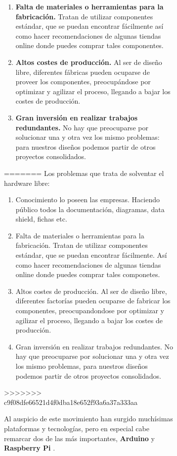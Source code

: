 \begin{itemize}
\begin{itemize}
\begin{figure}[h]
\begin{figure}[h]
\begin{enumerate}
	\item \textbf{Falta de materiales o herramientas para la fabricación.} 	Tratan de utilizar componentes estándar, que se puedan encontrar fácilmente así como hacer recomendaciones de algunas tiendas online donde puedes comprar tales componentes.  

	\item \textbf{Altos costes de producción.} Al ser de diseño libre, diferentes fábricas pueden ocuparse de proveer los componentes, preocupándose por optimizar y agilizar el proceso, llegando a bajar los costes de producción.

	\item \textbf{Gran inversión en realizar trabajos redundantes.}	No hay que preocuparse por solucionar una y otra vez los mismo problemas: para nuestros diseños podemos partir de otros proyectos consolidados.
\end{enumerate}

=======
Los problemas que trata de solventar el hardware libre:

\bigskip
\begin{enumerate}
	\item Conocimiento lo poseen las empresas.
	Haciendo público todos la documentación, diagramas, data shield, fichas etc.

	\item Falta de materiales o herramientas para la fabricación.
	Tratan de utilizar componentes estándar, que se puedan encontrar fácilmente. 
	Así como hacer recomendaciones de algunas tiendas online donde puedes comprar tales componetes.  

	\item Altos costes de producción.
	Al ser de diseño libre, diferentes factorías pueden ocuparse de fabricar los componentes, preocupandondose por optimizar y agilizar el proceso, llegando a bajar los costes de producción.

	\item Gran inversión en realizar trabajos redundantes. 
	No hay que preocuparse por solucionar una y otra vez los mismo problemas, para nuestros diseños podemos partir de otros proyectos consolidados.
		  
\end{enumerate}
>>>>>>> c9f08dfe66521d4f0dba18e652f93a6a37a333aa

Al auspicio de este movimiento han surgido muchísimas plataformas y tecnologías, pero en especial cabe remarcar dos de las más importantes, \textbf{Arduino} \cite{ARDUINO} y \textbf{Raspberry Pi} \cite{raspberry}.


\end{figure}
\end{figure}
\end{itemize}
\end{itemize}
